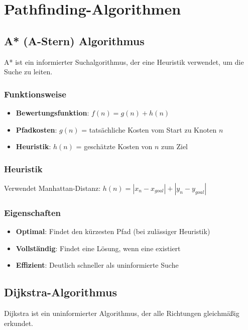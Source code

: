 \documentclass[12pt,a4paper]{article}
\begin{document}
\section{Pathfinding-Algorithmen}

\subsection{A* (A-Stern) Algorithmus}

A* ist ein informierter Suchalgorithmus, der eine Heuristik verwendet, um die Suche zu leiten.

\subsubsection{Funktionsweise}
\begin{itemize}
    \item \textbf{Bewertungsfunktion}: $f(n) = g(n) + h(n)$
    \item \textbf{Pfadkosten}: $g(n)$ = tatsächliche Kosten vom Start zu Knoten $n$
    \item \textbf{Heuristik}: $h(n)$ = geschätzte Kosten von $n$ zum Ziel
\end{itemize}

\subsubsection{Heuristik}
Verwendet Manhattan-Distanz: $h(n) = |x_n - x_{goal}| + |y_n - y_{goal}|$

\subsubsection{Eigenschaften}
\begin{itemize}
    \item \textbf{Optimal}: Findet den kürzesten Pfad (bei zulässiger Heuristik)
    \item \textbf{Vollständig}: Findet eine Lösung, wenn eine existiert
    \item \textbf{Effizient}: Deutlich schneller als uninformierte Suche
\end{itemize}

\subsection{Dijkstra-Algorithmus}

Dijkstra ist ein uninformierter Algorithmus, der alle Richtungen gleichmäßig erkundet.
\end{document}

